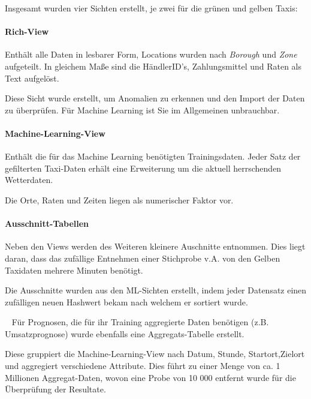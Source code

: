Insgesamt wurden vier Sichten erstellt, je zwei für die grünen und gelben Taxis:

\paragraph{Rich-View}
Enthält alle Daten in lesbarer Form, Locations wurden nach \textit{Borough} und \textit{Zone} aufgeteilt. In gleichem Maße sind die HändlerID's, Zahlungsmittel und Raten als Text aufgelöst.

Diese Sicht wurde erstellt, um Anomalien zu erkennen und den Import der Daten zu überprüfen. Für Machine Learning ist Sie im Allgemeinen unbrauchbar. 

\paragraph{Machine-Learning-View}
Enthält die für das Machine Learning benötigten Trainingsdaten. Jeder Satz der gefilterten Taxi-Daten erhält eine Erweiterung um die aktuell herrschenden Wetterdaten. 

Die Orte, Raten und Zeiten liegen als numerischer Faktor vor. 

\paragraph{Ausschnitt-Tabellen}
Neben den Views werden des Weiteren kleinere Auschnitte entnommen. Dies liegt daran, dass das zufällige Entnehmen einer Stichprobe v.A. von den Gelben Taxidaten mehrere Minuten benötigt. 

Die Ausschnitte wurden aus den ML-Sichten erstellt, indem jeder Datensatz einen zufälligen neuen Hashwert bekam nach welchem er sortiert wurde. 

~\newline
Für Prognosen, die für ihr Training aggregierte Daten benötigen (z.B. Umsatzprognose) wurde ebenfalls eine Aggregats-Tabelle erstellt. 

Diese gruppiert die Machine-Learning-View nach Datum, Stunde, Startort,Zielort und aggregiert verschiedene Attribute. Dies führt zu einer Menge von ca. 1 Millionen Aggregat-Daten, wovon eine Probe von 10 000 entfernt wurde für die Überprüfung der Resultate.